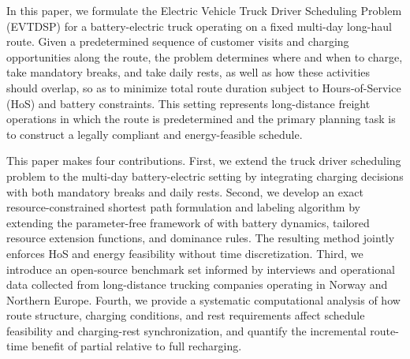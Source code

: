 \documentclass[3p,11pt,authoryear]{elsarticle}  %
\begin{document}
    In this paper, we formulate the Electric Vehicle Truck Driver Scheduling Problem (EVTDSP) for a battery-electric truck operating on a fixed multi-day long-haul route. Given a predetermined sequence of customer visits and charging opportunities along the route, the problem determines where and when to charge, take mandatory breaks, and take daily rests, as well as how these activities should overlap, so as to minimize total route duration subject to Hours-of-Service (HoS) and battery constraints. This setting represents long-distance freight operations in which the route is predetermined and the primary planning task is to construct a legally compliant and energy-feasible schedule.
    
    This paper makes four contributions. First, we extend the truck driver scheduling problem to the multi-day battery-electric setting by integrating charging decisions with both mandatory breaks and daily rests. Second, we develop an exact resource-constrained shortest path formulation and labeling algorithm by extending the parameter-free framework of \citet{goel2017exact} with battery dynamics, tailored resource extension functions, and dominance rules. The resulting method jointly enforces HoS and energy feasibility without time discretization. Third, we introduce an open-source benchmark set informed by interviews and operational data collected from long-distance trucking companies operating in Norway and Northern Europe. Fourth, we provide a systematic computational analysis of how route structure, charging conditions, and rest requirements affect schedule feasibility and charging-rest synchronization, and quantify the incremental route-time benefit of partial relative to full recharging.



\end{document}
